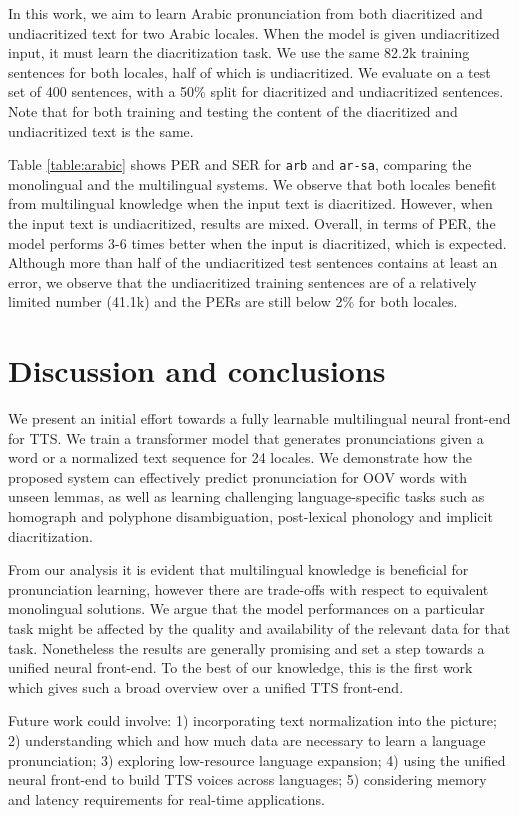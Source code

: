 In this work, we aim to learn Arabic pronunciation from both diacritized and undiacritized text for two Arabic locales. When the model is given undiacritized input, it must learn the diacritization task.
We use the same \mytextapprox82.2k training sentences for both locales, half of which is undiacritized.
We evaluate on a test set of 400 sentences, with a 50\% split for diacritized and undiacritized sentences. 
Note that for both training and testing the content of the diacritized and undiacritized text is the same.


Table \ref{table:arabic} shows PER and SER for \texttt{arb} and \texttt{ar-sa}, comparing the monolingual and the multilingual systems.
We observe that both locales benefit from multilingual knowledge when the input text is diacritized. However, when the input text is undiacritized, results are mixed. Overall, in terms of PER, the model performs 3-6 times better when the input is diacritized, which is expected. Although more than half of the undiacritized test sentences contains at least an error, we observe that the undiacritized training sentences are of a relatively limited number (\mytextapprox41.1k) and the PERs are still below 2\% for both locales. 


\section{Discussion and conclusions}
\label{sec:conclusions}
We present an initial effort towards a fully learnable multilingual neural front-end for TTS. We train a transformer model that generates pronunciations given a word or a normalized text sequence for 24 locales. We demonstrate how the proposed system can effectively predict pronunciation for OOV words with unseen lemmas, as well as learning challenging language-specific tasks such as homograph and polyphone disambiguation, post-lexical phonology and implicit diacritization. 

From our analysis it is evident that multilingual knowledge is beneficial for pronunciation learning, however there are trade-offs with respect to equivalent monolingual solutions. We argue that the model performances on a particular task might be affected by the quality and availability of the relevant data for that task. Nonetheless the results are generally promising and set a step towards a unified neural front-end. To the best of our knowledge, this is the first work which gives such a broad overview over a unified TTS front-end. 

Future work could involve: 1) incorporating text normalization into the picture; 2) understanding which and how much data are necessary to learn a language pronunciation; 3) exploring low-resource language expansion; 4) using the unified neural front-end to build TTS voices across languages; 5) considering memory and latency requirements for real-time applications.
